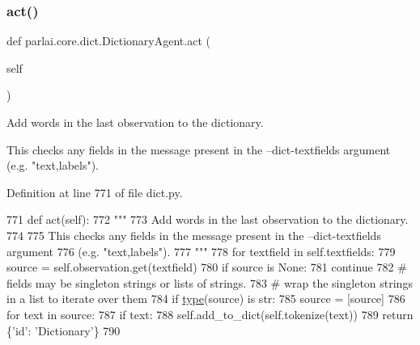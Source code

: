 \subsubsection{\texorpdfstring{act()}{act()}}
{\footnotesize\ttfamily def parlai.\+core.\+dict.\+Dictionary\+Agent.\+act (\begin{DoxyParamCaption}\item[{}]{self }\end{DoxyParamCaption})}

\begin{DoxyVerb}Add words in the last observation to the dictionary.

This checks any fields in the message present in the --dict-textfields argument
(e.g. "text,labels").
\end{DoxyVerb}
 

Definition at line 771 of file dict.\+py.


\begin{DoxyCode}
771     \textcolor{keyword}{def }act(self):
772         \textcolor{stringliteral}{"""}
773 \textcolor{stringliteral}{        Add words in the last observation to the dictionary.}
774 \textcolor{stringliteral}{}
775 \textcolor{stringliteral}{        This checks any fields in the message present in the --dict-textfields argument}
776 \textcolor{stringliteral}{        (e.g. "text,labels").}
777 \textcolor{stringliteral}{        """}
778         \textcolor{keywordflow}{for} textfield \textcolor{keywordflow}{in} self.textfields:
779             source = self.observation.get(textfield)
780             \textcolor{keywordflow}{if} source \textcolor{keywordflow}{is} \textcolor{keywordtype}{None}:
781                 \textcolor{keywordflow}{continue}
782             \textcolor{comment}{# fields may be singleton strings or lists of strings.}
783             \textcolor{comment}{# wrap the singleton strings in a list to iterate over them}
784             \textcolor{keywordflow}{if} \hyperlink{namespaceparlai_1_1agents_1_1tfidf__retriever_1_1build__tfidf_ad5dfae268e23f506da084a9efb72f619}{type}(source) \textcolor{keywordflow}{is} str:
785                 source = [source]
786             \textcolor{keywordflow}{for} text \textcolor{keywordflow}{in} source:
787                 \textcolor{keywordflow}{if} text:
788                     self.add\_to\_dict(self.tokenize(text))
789         \textcolor{keywordflow}{return} \{\textcolor{stringliteral}{'id'}: \textcolor{stringliteral}{'Dictionary'}\}
790 
\end{DoxyCode}
\mbox{\label{classparlai_1_1core_1_1dict_1_1DictionaryAgent_ad09f8ecf2b258ecaebce69d9cef9ff3c}} 
